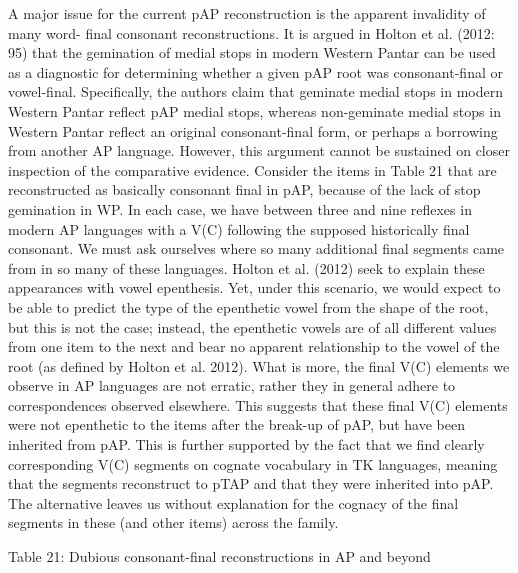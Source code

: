 \documentclass[a4paper]{article}
\begin{document}
A major issue for the current pAP reconstruction is the apparent invalidity of many word- final consonant reconstructions. It is argued in Holton et al. (2012: 95) that the gemination of medial stops in modern Western Pantar can be used as a diagnostic for determining whether a given pAP root was consonant-final or vowel-final. Specifically, the authors claim that geminate medial stops in modern Western Pantar reflect pAP medial stops, whereas non-geminate medial stops in Western Pantar reflect an original consonant-final form, or perhaps a borrowing from another AP language. However, this argument cannot be sustained on closer inspection of the comparative evidence. Consider the items in Table 21 that are reconstructed as basically consonant final in pAP, because of the lack of stop gemination in WP. In each case, we have between three and nine reflexes in modern AP languages with a V(C) following the supposed historically final consonant. We must ask ourselves where so many additional final segments came from in so many of these languages. Holton et al. (2012) seek to explain these appearances with vowel epenthesis. Yet, under this scenario, we would expect to be able to predict the type of the epenthetic vowel from the shape of the root, but this is not the case; instead, the epenthetic vowels are of all different values from one item to the next and bear no apparent relationship to the vowel of the root (as defined by Holton et al. 2012). What is more, the final V(C) elements we observe in AP languages are not erratic, rather they in general adhere to correspondences observed elsewhere. This suggests that these final V(C) elements were not epenthetic to the items after the break-up of pAP, but have been inherited from pAP. This is further supported by the fact that we find clearly corresponding V(C) segments on cognate vocabulary in TK languages, meaning that the segments reconstruct to pTAP and that they were inherited into pAP. The alternative leaves us without explanation for the cognacy of the final segments in these (and other items) across the family. 

{\centering
Table 21: Dubious consonant-final reconstructions in AP and beyond
\par}
\end{document}
